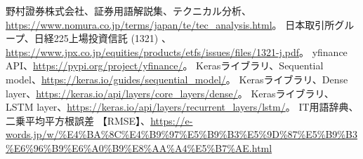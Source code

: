 \documentclass[a4paper, 11pt, titlepage]{jsarticle}
\begin{document}
\begin{thebibliography}{99}
   野村證券株式会社、証券用語解説集、テクニカル分析、\url{https://www.nomura.co.jp/terms/japan/te/tec_analysis.html}。
   日本取引所グループ、日経225上場投資信託 (1321) 、\url{https://www.jpx.co.jp/equities/products/etfs/issues/files/1321-j.pdf}。
   yfinance API、\url{https://pypi.org/project/yfinance/}。
   Kerasライブラリ、Sequential model、\url{https://keras.io/guides/sequential_model/}。
   Kerasライブラリ、Dense layer、\url{https://keras.io/api/layers/core_layers/dense/}。
   Kerasライブラリ、LSTM layer、\url{https://keras.io/api/layers/recurrent_layers/lstm/}。
   IT用語辞典、二乗平均平方根誤差 【RMSE】、\url{https://e-words.jp/w/%E4%BA%8C%E4%B9%97%E5%B9%B3%E5%9D%87%E5%B9%B3%E6%96%B9%E6%A0%B9%E8%AA%A4%E5%B7%AE.html}
\end{thebibliography}
\end{document}
